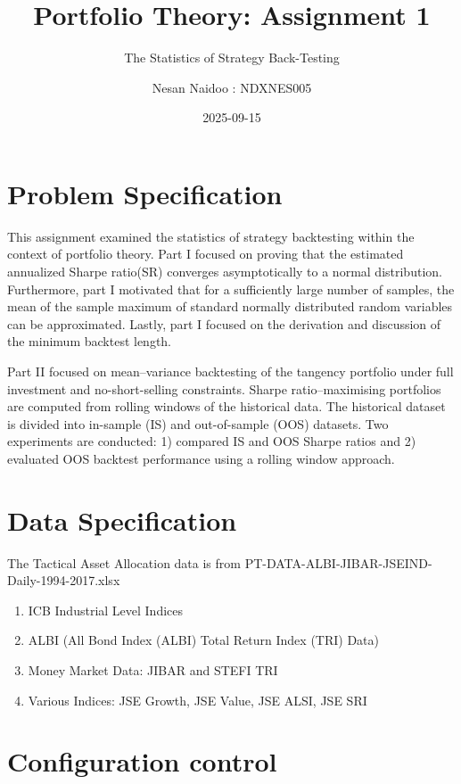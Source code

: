 \documentclass[
  12pt,
]{article}
\title{Portfolio Theory: Assignment 1}
\subtitle{The Statistics of Strategy Back-Testing}
\author{Nesan Naidoo : NDXNES005}
\date{2025-09-15}
\begin{document}
\maketitle

\section{Problem Specification}\label{problem-specification}

This assignment examined the statistics of strategy backtesting within
the context of portfolio theory. Part I focused on proving that the
estimated annualized Sharpe ratio(SR) converges asymptotically to a
normal distribution. Furthermore, part I motivated that for a
sufficiently large number of samples, the mean of the sample maximum of
standard normally distributed random variables can be approximated.
Lastly, part I focused on the derivation and discussion of the minimum
backtest length.

Part II focused on mean--variance backtesting of the tangency portfolio
under full investment and no-short-selling constraints. Sharpe
ratio--maximising portfolios are computed from rolling windows of the
historical data. The historical dataset is divided into in-sample (IS)
and out-of-sample (OOS) datasets. Two experiments are conducted: 1)
compared IS and OOS Sharpe ratios and 2) evaluated OOS backtest
performance using a rolling window approach.

\section{Data Specification}\label{data-specification}

The Tactical Asset Allocation data is from
PT-DATA-ALBI-JIBAR-JSEIND-Daily-1994-2017.xlsx

\begin{enumerate}
\def\labelenumi{\arabic{enumi}.}
\item
  ICB Industrial Level Indices
\item
  ALBI (All Bond Index (ALBI) Total Return Index (TRI) Data)
\item
  Money Market Data: JIBAR and STEFI TRI
\item
  Various Indices: JSE Growth, JSE Value, JSE ALSI, JSE SRI
\end{enumerate}

\section{Configuration control}\label{configuration-control}
\end{document}
